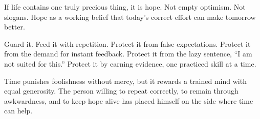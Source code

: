 If life contains one truly precious thing, it is hope. Not empty optimism. Not slogans. Hope as a working belief that today's correct effort can make tomorrow better.

Guard it. Feed it with repetition. Protect it from false expectations. Protect it from the demand for instant feedback. Protect it from the lazy sentence, ``I am not suited for this.'' Protect it by earning evidence, one practiced skill at a time.

Time punishes foolishness without mercy, but it rewards a trained mind with equal generosity. The person willing to repeat correctly, to remain through awkwardness, and to keep hope alive has placed himself on the side where time can help.
